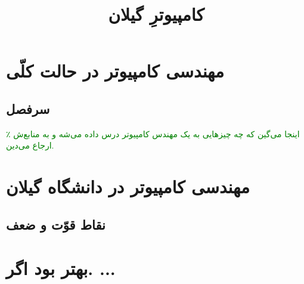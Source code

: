 \documentclass{article}
\begin{document}
\title{کامپیوترِ گیلان}
\maketitle
\section{مهندسی کامپیوتر در حالت کلّی}
\subsection{سرفصل}
\textcolor{green}{٪ اینجا می‌گین که چه چیز‌هایی به یک مهندس کامپیوتر درس داده می‌شه و به منابع‌ش ارجاع می‌دین.}
\section{مهندسی کامپیوتر در دانشگاه گیلان}
\subsection{نقاط قوّت و ضعف}
\section{بهتر بود اگر. ...}
\end{document}
